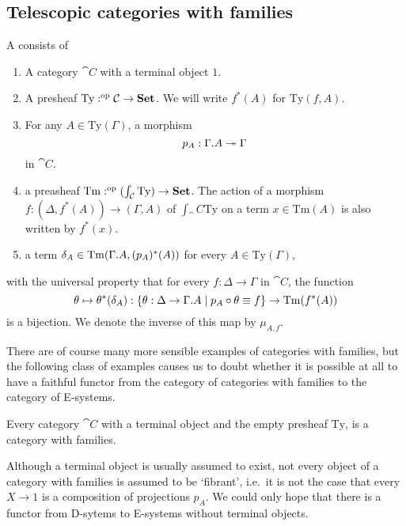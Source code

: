 \subsection{Telescopic categories with families}

\begin{defn}
A  consists of
\begin{enumerate}
\item A category $\cat{C}$ with a terminal object $1$.
\item A presheaf $\mathrm{Ty}:^{\mathrm{op}}{\mathcal{C}}\to\mathbf{Set}$. We will write
$f^\ast(A)$ for $\mathrm{Ty}(f,A)$.
\item For any $A\in\mathrm{Ty}(\Gamma)$, a morphism
\begin{equation*}
p_A : \ctxext{\Gamma}{A}\twoheadrightarrow \Gamma
\end{equation*}
in $\cat{C}$.
\item a preasheaf $\mathrm{Tm}:^{\mathrm{op}}{(\int_\mathcal{C}\mathrm{Ty})}\to\mathbf{Set}$.
The action of a morphism $f:(\Delta,f^\ast(A))\to(\Gamma,A)$ of $\int_\cat{C}\mathrm{Ty}$
on a term $x\in \mathrm{Tm}(A)$ is also written by $f^\ast(x)$.
\item a term $\delta_A\in\mathrm{Tm}(\ctxext{\Gamma}{A},(p_A)^\ast(A))$ for every
$A\in\mathrm{Ty}(\Gamma)$, 
\end{enumerate}
with the universal property that for every $f:\Delta\to\Gamma$ in $\cat{C}$, 
the function
\begin{equation*}
\theta\mapsto\theta^\ast(\delta_A)
  : \{\theta:\Delta\to\ctxext{\Gamma}{A}\mid p_A\circ\theta\jdeq f\}\to
    \mathrm{Tm}(f^\ast(A))
\end{equation*}
is a bijection. We denote the inverse of this map by $\mu_{A,f}$. 
\end{defn}

There are of course many more sensible examples of categories with families,
but the following class of examples causes us to doubt whether it is possible
at all to have a faithful functor from the category of categories
with families to the category of E-systems. 

\begin{eg}
Every category $\cat{C}$ with a terminal object and the empty presheaf 
$\mathrm{Ty}$, is a category with families.
\end{eg}

\begin{rmk}
Although a terminal object is usually assumed to exist, not every object 
of a category with families is assumed to be `fibrant', i.e.~it is
not the case that every $X\to 1$ is a composition of projections $p_A$.
We could only hope that there is a functor from D-sytems to E-systems without
terminal objects.
\end{rmk}

